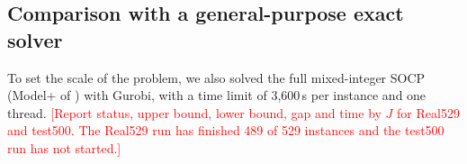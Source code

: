 \documentclass[preprint,12pt,authoryear]{elsarticle}
\newcommand{\placeholder}[1]{\textcolor{red}{[#1]}}
\begin{document}
\begin{table}[t]
\centering
\caption{Real529 gap to the best known solution (BKS), $100\,(\mathrm{UB}-\mathrm{BKS})/\mathrm{UB}$, where UB is the upper bound found by the method, by subset. Budgets are multiples of the single-core time of E133.}
\label{tab:meta}
\small
{}
\end{table}

\subsection{Comparison with a general-purpose exact solver}

To set the scale of the problem, we also solved the full mixed-integer SOCP (Model+ of \citet{li2025}) with Gurobi, with a time limit of 3,600\,s per instance and one thread. \placeholder{Report status, upper bound, lower bound, gap and time by $J$ for Real529 and test500. The Real529 run has finished 489 of 529 instances and the test500 run has not started.}
\end{document}
